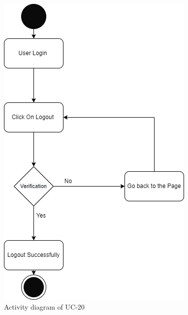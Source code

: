 \begin{figure}[H]
    \centering
    \includegraphics[scale=0.7]{./diagrams/Activity Diagram/ad-20.png}
    \caption{Activity diagram of UC-20}
    \label{fig:act-20}

\end{figure}

